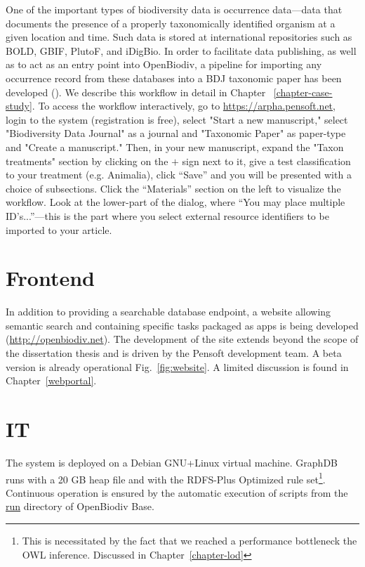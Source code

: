 One of the important types of biodiversity data is occurrence data---data that documents the presence of a properly taxonomically identified organism at a given location and time. Such data is stored at international repositories such as BOLD, GBIF, PlutoF, and iDigBio. In order to facilitate data publishing, as well as to act as an entry point into OpenBiodiv, a pipeline for importing any occurrence record from these databases into a BDJ taxonomic paper has been developed (\cite{senderov_online_2016}). We describe this workflow in detail in Chapter ~\ref{chapter-case-study}. To access the workflow interactively, go to \url{https://arpha.pensoft.net}, login to the system (registration is free), select "Start a new manuscript," select "Biodiversity Data Journal" as a journal and "Taxonomic Paper" as paper-type and "Create a manuscript." Then, in your new manuscript, expand the "Taxon treatments" section by clicking on the $+$ sign next to it, give a test classification to your treatment (e.g. Animalia), click ``Save'' and you will be presented with a choice of subsections. Click the ``Materials'' section on the left to visualize the workflow. Look at the lower-part of the dialog, where ``You may place multiple ID's...''---this is the part where you select external resource identifiers to be imported to your article.

\section{Frontend}

In addition to providing a searchable database endpoint, a website allowing semantic search and containing specific tasks packaged as apps is being developed (\url{http://openbiodiv.net}). The development of the site extends beyond the scope of the dissertation thesis and is driven by the Pensoft development team. A beta version is already operational Fig.~\ref{fig:website}. A limited discussion is found in Chapter~\ref{webportal}.


\section{IT}

The system is deployed on a Debian GNU+Linux virtual machine. GraphDB runs with a 20 GB heap file and with the RDFS-Plus Optimized rule set\footnote{This is necessitated by the fact that we reached a performance bottleneck the OWL inference. Discussed in Chapter~\ref{chapter-lod}}.  Continuous operation is ensured by the automatic execution of scripts from the \url{run} directory of OpenBiodiv Base.

